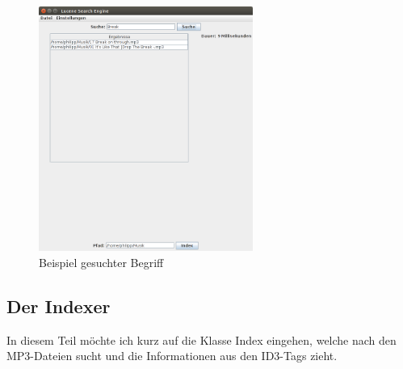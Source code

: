 \documentclass[12pt,a4paper,ngerman]{report}
\begin{document}
\begin{figure}[h!]
\centering
\includegraphics[width=7cm]{img/Lucene_Search_Engine_2.png}
\caption{Beispiel gesuchter Begriff\protect\footnotemark}
\end{figure}
\subsection*{Der Indexer}
In diesem Teil möchte ich kurz auf die Klasse Index eingehen, welche nach den MP3-Dateien sucht und die Informationen aus den ID3-Tags zieht. 
\end{document}
